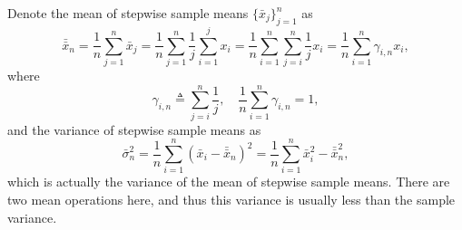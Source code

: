 \documentclass{article}
\begin{document}
Denote the mean of stepwise sample means $\{\bar{x}_j\}_{j=1}^n$ as
\begin{equation}
    \bar{\bar{x}}_n
    =\frac{1}{n}\sum_{j=1}^n\bar{x}_j
    =\frac{1}{n}\sum_{j=1}^n\frac{1}{j}\sum_{i=1}^jx_i
    =\frac{1}{n}\sum_{i=1}^n\sum_{j=i}^n\frac{1}{j}x_i
    =\frac{1}{n}\sum_{i=1}^n\gamma_{i,n} x_i,
\end{equation}
where
\begin{equation}
  \gamma_{i,n}\triangleq\sum_{j=i}^n\frac{1}{j},\quad
  \frac{1}{n}\sum_{i=1}^n\gamma_{i,n}=1,
\end{equation}
and the variance of stepwise sample means as
\begin{equation}
  \bar{\sigma}_n^2
  =\frac{1}{n}\sum_{i=1}^n(\bar{x}_i-\bar{\bar{x}}_n)^2=\frac{1}{n}\sum_{i=1}^n\bar{x}_i^2-\bar{\bar{x}}_n^2,
\end{equation}
which is actually the variance of the mean of stepwise sample means. There are two mean operations here, and thus this variance is usually less than the sample variance.
\end{document}
